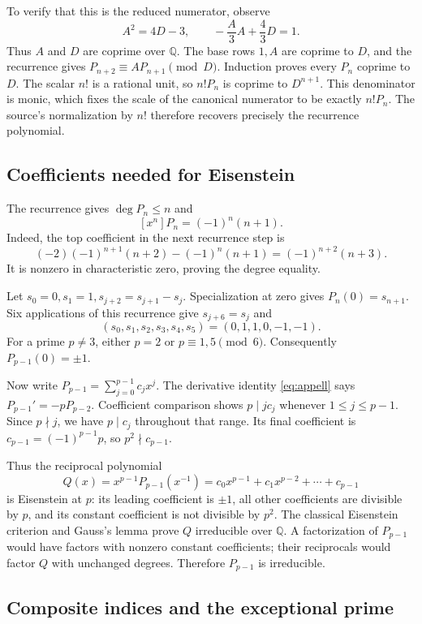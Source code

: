 \documentclass[11pt]{article}
\newcommand{\Q}{\mathbb Q}
\begin{document}
To verify that this is the reduced numerator, observe
\[
A^2=4D-3,\qquad -\frac A3 A+\frac43D=1.
\]
Thus $A$ and $D$ are coprime over $\Q$. The base rows $1,A$
are coprime to $D$, and the recurrence gives
$P_{n+2}\equiv AP_{n+1}\pmod D$. Induction proves every $P_n$
coprime to $D$. The scalar $n!$ is a rational unit, so $n!P_n$
is coprime to $D^{n+1}$. This denominator is monic, which fixes
the scale of the canonical numerator to be exactly $n!P_n$.
The source's normalization by $n!$ therefore recovers precisely
the recurrence polynomial.

\subsection{Coefficients needed for Eisenstein}

The recurrence gives $\deg P_n\le n$ and
\begin{equation}\label{eq:leading}
[x^n]P_n=(-1)^n(n+1).
\end{equation}
Indeed, the top coefficient in the next recurrence step is
\[
(-2)(-1)^{n+1}(n+2)-(-1)^n(n+1)
=(-1)^{n+2}(n+3).
\]
It is nonzero in characteristic zero, proving the degree equality.

Let $s_0=0,s_1=1,s_{j+2}=s_{j+1}-s_j$. Specialization at zero gives
$P_n(0)=s_{n+1}$. Six applications of this recurrence give
$s_{j+6}=s_j$ and
\[
(s_0,s_1,s_2,s_3,s_4,s_5)=(0,1,1,0,-1,-1).
\]
For a prime $p\ne3$, either $p=2$ or $p\equiv1,5\pmod6$.
Consequently $P_{p-1}(0)=\pm1$.

Now write $P_{p-1}=\sum_{j=0}^{p-1}c_jx^j$. The derivative identity
\eqref{eq:appell} says $P_{p-1}'=-pP_{p-2}$. Coefficient comparison
shows $p\mid jc_j$ whenever $1\le j\le p-1$. Since $p\nmid j$,
we have $p\mid c_j$ throughout that range. Its final coefficient
is $c_{p-1}=(-1)^{p-1}p$, so $p^2\nmid c_{p-1}$.

Thus the reciprocal polynomial
\[
Q(x)=x^{p-1}P_{p-1}(x^{-1})
=c_0x^{p-1}+c_1x^{p-2}+\cdots+c_{p-1}
\]
is Eisenstein at $p$: its leading coefficient is $\pm1$, all other
coefficients are divisible by $p$, and its constant coefficient
is not divisible by $p^2$. The classical Eisenstein criterion and
Gauss's lemma prove $Q$ irreducible over $\Q$. A factorization of
$P_{p-1}$ would have factors with nonzero constant coefficients;
their reciprocals would factor $Q$ with unchanged degrees.
Therefore $P_{p-1}$ is irreducible.

\subsection{Composite indices and the exceptional prime}
\end{document}
